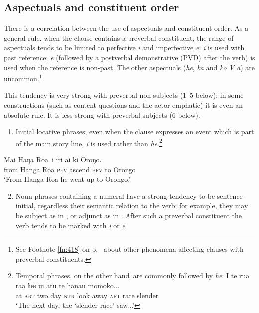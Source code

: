 \subsection{Aspectuals and constituent order}\label{sec:7.2.8}

There is a correlation between the use of aspectuals and constituent order. As a general rule, when the clause contains a preverbal constituent, the range of aspectuals tends to be limited to perfective \textit{i} and imperfective \textit{e}: \textit{i} is used with past reference; \textit{e} (followed by a postverbal demonstrative (PVD) after the verb) is used when the reference is non-past. The other aspectuals (\textit{he}, \textit{ka} and \textit{ko V {\ꞌ}ā}) are uncommon.\footnote{\label{fn:337}See Footnote \ref{fn:418} on p.~\pageref{fn:418} about other phenomena affecting clauses with preverbal constituents.} 

This tendency is very strong with preverbal non-subjects (1–5 below); in some constructions (such as content questions and the actor-emphatic) it is even an absolute rule. It is less strong with preverbal subjects (6 below).

\begin{enumerate}
\item 
Initial locative phrases; even when the clause expresses an event which is part of the main story line, \textit{i} is used rather than \textit{he}.\footnote{\label{fn:338}Temporal phrases, on the other hand, are commonly followed by \textit{he}:
\ea
\gll 
{\ꞌ}I te rua ra{\ꞌ}ā \textbf{he} u{\ꞌ}i atu te hānau momoko...\\
   at \textsc{art} two day \textsc{ntr} look away \textsc{art} race slender \\
   \glt 
  ‘The next day, the ‘slender race’ saw...’ \textstyleExampleref{[Ley-3-06.028]}  \z }
\end{enumerate}

\ea\label{ex:7.76}
\gll {\ob}Mai Haŋa Roa\,{\cb} i iri ai ki {\ꞌ}Ōroŋo. \\
{\db}from Hanga Roa \textsc{pfv} ascend \textsc{pfv} to Orongo \\

\glt
‘From Hanga Roa he went up to Orongo.’ \textstyleExampleref{[Ley-2-02.054]}
\z

\begin{enumerate}
\setcounter{enumi}{1} 
\item 
Noun phrases containing a numeral have a strong tendency to be sentence-initial, regardless their semantic relation to the verb; for example, they may be subject as in , or adjunct as in . After such a preverbal constituent the verb tends to be marked with \textit{i} or \textit{e}. 

\end{enumerate}

